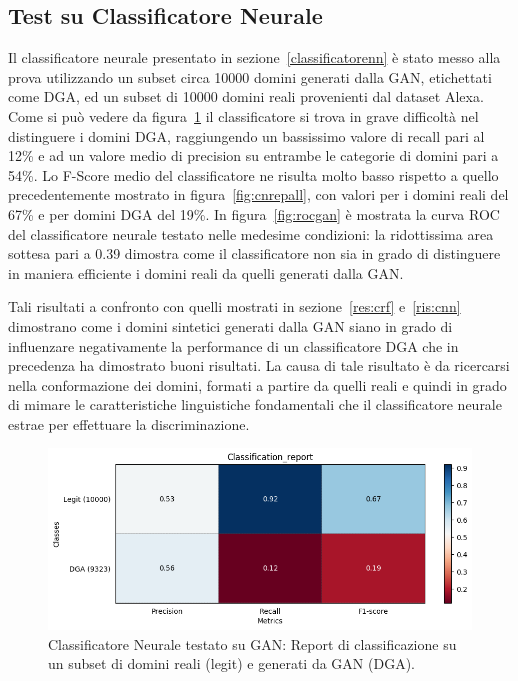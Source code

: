 \newpage
\subsection{Test su Classificatore Neurale}
Il classificatore neurale presentato in sezione~\ref{classificatorenn} è stato messo alla prova utilizzando un subset circa 10000 domini generati dalla GAN, etichettati come DGA, ed un subset di 10000 domini reali provenienti dal dataset Alexa. 
Come si può vedere da figura~\ref{fig:repgan} il classificatore si trova in grave difficoltà nel distinguere i domini DGA, raggiungendo un bassissimo valore di recall pari al 12\% e ad un valore medio di precision su entrambe le categorie di domini pari a 54\%. Lo F-Score medio del classificatore ne risulta molto basso rispetto a quello precedentemente mostrato in figura~\ref{fig:cnrepall}, con valori per i domini reali del 67\% e per domini DGA del 19\%.
In figura~\ref{fig:rocgan} è mostrata la curva ROC del classificatore neurale testato nelle medesime condizioni: la ridottissima area sottesa pari a 0.39 dimostra come il classificatore non sia in grado di distinguere in maniera efficiente i domini reali da quelli generati dalla GAN. 

Tali risultati a confronto con quelli mostrati in sezione~\ref{res:crf} e~\ref{ris:cnn} dimostrano come i domini sintetici generati dalla GAN siano in grado di influenzare negativamente la performance di un classificatore DGA che in precedenza ha dimostrato buoni risultati. La causa di tale risultato è da ricercarsi nella conformazione dei domini, formati a partire da quelli reali e quindi in grado di mimare le caratteristiche linguistiche fondamentali che il classificatore neurale estrae per effettuare la discriminazione.

\begin{figure}[!bp]
    \centering
    \includegraphics[width=\columnwidth]{figures/gan/class_rep.png}
    \caption{Classificatore Neurale testato su GAN: Report di classificazione su un subset di domini reali (legit) e generati da GAN (DGA).\label{fig:repgan}}
\end{figure}

